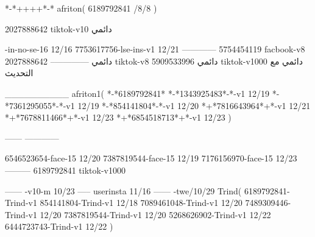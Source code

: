 *-*++++*-*
afriton(
6189792841 /8/8
)

2027888642 tiktok-v10
دائمي

-in-no-se-16 12/16
7753617756-lse-ins-v1 12/21
------------
5754454119 facbook-v8
دائمي
--------------
2027888642 tiktok-v8
دائمي
5909533996 tiktok-v1000
دائمي مع التحديث

__________
afriton1(
*-*6189792841*
*-*1343925483*-*-v1 12/19
*-*7361295055*-*-v1 12/19
*-*854141804*-*-v1 12/20
*+*7816643964*+*-v1 12/21
*+*7678811466*+*-v1 12/23
*+*6854518713*+*-v1 12/23
)

------
------------


6546523654-face-15 12/20
7387819544-face-15 12/19
7176156970-face-15 12/23
---------
6189792841 tiktok-v1000
 
------
-v10-m 10/23
-----
userinsta 11/16
------
-twe/10/29
Trind(
6189792841-Trind-v1 
854141804-Trind-v1 12/18
7089461048-Trind-v1 12/20
7489309446-Trind-v1 12/20
7387819544-Trind-v1 12/20
5268626902-Trind-v1 12/22
6444723743-Trind-v1 12/22
)
